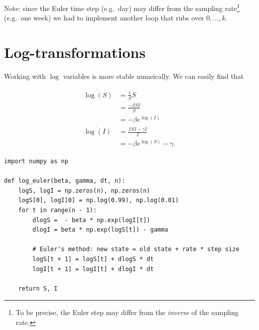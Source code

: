 Note: since the Euler time step (e.g.~day) may differ from the
sampling rate\footnote{To be precise, the Euler step may differ from
the \emph{inverse} of the sampling rate.} (e.g.~one week) we had to
implement another loop that rubs over $0,...,k$.

\section{Log-transformations}

Working with $\log$ variables is more stable numeically. We can easily
find that

\begin{align*}
  \dot{\log(S)} &= \frac{1}{S} \dot{S}  \\
  &=  \frac{-\beta S I}{S} \\
  &= -\beta e^{\log(I)}\\ 
  \dot {\log(I)} &= \frac{\beta SI -\gamma I}{I} \\
  &= -\beta e^{\log(S)} - \gamma.
\end{align*}

\begin{lstlisting}
import numpy as np

def log_euler(beta, gamma, dt, n):
    logS, logI = np.zeros(n), np.zeros(n)
    logS[0], logI[0] = np.log(0.99), np.log(0.01) 
    for t in range(n - 1):
        dlogS =  - beta * np.exp(logI[t])
        dlogI = beta * np.exp(logS[t]) - gamma 

        # Euler's method: new state = old state + rate * step size
        logS[t + 1] = logS[t] + dlogS * dt
        logI[t + 1] = logI[t] + dlogI * dt
        
    return S, I
\end{lstlisting}






